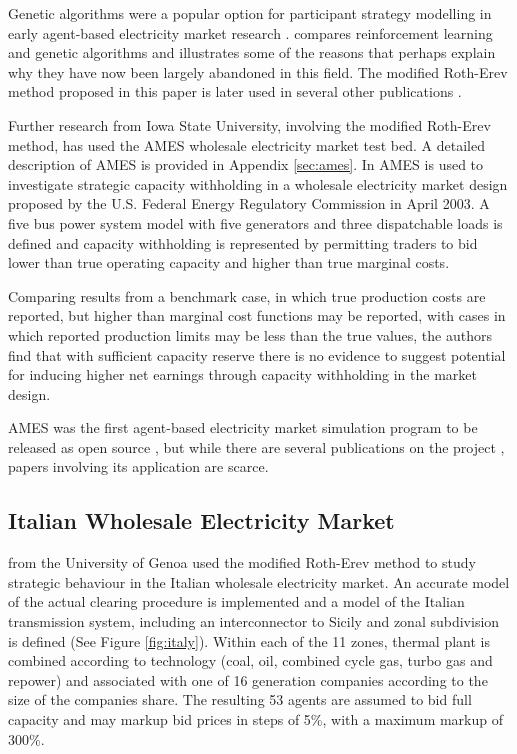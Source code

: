 Genetic algorithms were a popular option for participant strategy modelling
in early agent-based electricity market research
\cite{richter:1998,petrov:2000,lane:2000}.  compares
reinforcement learning and genetic algorithms and illustrates some of the
reasons that perhaps explain why they have now been largely abandoned in this
field. The modified Roth-Erev method proposed in this paper is later used in
several other publications \cite{cincotti:09,weidlich:06,viet:06}.

Further research from Iowa State University, involving the modified Roth-Erev
method, has used the AMES wholesale electricity market test bed.  A detailed
description of AMES is provided in Appendix \ref{sec:ames}.  In
 AMES is used to investigate strategic capacity withholding
in a wholesale electricity market design proposed by the U.S. Federal Energy
Regulatory Commission in April 2003.  A five bus power system model with five
generators and three dispatchable loads is defined and capacity withholding is
represented by permitting traders to bid lower than true operating capacity and
higher than true marginal costs.

Comparing results from a benchmark case, in which true production costs are
reported, but higher than marginal cost functions may be reported, with cases
in which reported production limits may be less than the true values, the authors
find that with sufficient capacity reserve there is no evidence to suggest
potential for inducing higher net earnings through capacity withholding in the
market design.

AMES was the first agent-based electricity market simulation program to be
released as open source \cite{tesfatsi:wpmp}, but while there are several
publications on the project \cite{tesfatsi:dcopf,tesfatsi:pes09}, papers
involving its application are scarce.

\subsection{Italian Wholesale Electricity Market}


 from the University of Genoa used the modified Roth-Erev
method to study strategic behaviour in the Italian wholesale electricity market.
 An accurate model of the actual clearing procedure is implemented and a model
of the Italian transmission system, including an interconnector to Sicily and
zonal subdivision is defined (See Figure \ref{fig:italy}). Within each of the 11
zones, thermal plant is combined according to technology (coal, oil, combined
cycle gas, turbo gas and repower) and associated with one of 16 generation
companies according to the size of the companies share.  The resulting 53 agents
are assumed to bid full capacity and may markup bid prices in steps of 5\%, with
a maximum markup of 300\%.

